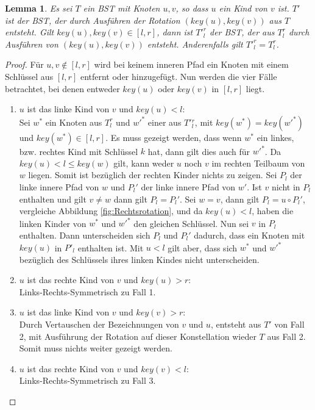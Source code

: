 \documentclass[a4paper,12pt]{article}
\newtheorem{Lemma}{Lemma}[section]
\begin{document}
\begin{Lemma}  \label{lemmaWilber1} Es sei $T$ ein BST mit Knoten $u, v$, so dass $u$ ein Kind von $v$ ist. $T'$ ist der BST, der durch Ausführen der Rotation $\left(\mathit{key}\left(u\right),\mathit{key}\left(v\right)\right)$ aus $T$ entsteht. Gilt $\mathit{key}\left(u\right),\mathit{key}\left(v\right) \in \left[l,r\right]$, dann ist ${T'}^r_l$ der BST, der aus $T^r_l$ durch Ausführen von  $\left(\mathit{key}\left(u\right),\mathit{key}\left(v\right)\right)$ entsteht. Anderenfalls gilt ${T'}^r_l = T^r_l$.
\end{Lemma}
\begin{proof}
	\noindent Für $u,v \notin \left[l,r\right]$ wird bei keinem inneren Pfad ein Knoten mit einem Schlüssel aus $\left[l,r\right]$ entfernt oder hinzugefügt.
	Nun werden die vier Fälle betrachtet, bei denen entweder $\mathit{key}\left(u\right)$ oder $\mathit{key}\left(v\right)$ in $\left[l,r\right]$ liegt.
	\begin{enumerate}
		\item $u$ ist das linke Kind von $v$ und $\mathit{key}\left(u\right) < l$:\\
		Sei $w^*$ ein Knoten aus $T^r_l$ und $w'^*$ einer aus $T'{^r_l}$, mit $\mathit{key}(w^*) = \mathit{key}(w'^*)$ und $\mathit{key}(w^*) \in \left[l,r\right]$. Es muss gezeigt werden, dass wenn $w^*$ ein linkes, bzw. rechtes Kind mit Schlüssel $k$ hat, dann gilt dies auch für $w'^*$. Da $\mathit{key}(u) < l \leq \mathit{key}(w) $ gilt, kann weder $u$ noch $v$ im rechten Teilbaum von $w$ liegen. Somit ist bezüglich der rechten Kinder nichts zu zeigen. 
		Sei $P_l$ der linke innere Pfad von $w$ und $ {P_l}'$ der linke innere Pfad von $w'$. Ist $v$ nicht in $P_l$ enthalten und gilt $v \neq w$ dann gilt $P_l = P{_l}'$. Sei $w = v$, dann gilt $P_l = u  \circ  {P_l}'$, vergleiche Abbildung \ref{fig:Rechtsrotation}, und da $\mathit{key}(u) < l$, haben die linken Kinder von $w^*$ und $w'^*$ den gleichen Schlüssel. Nun sei $v$ in $P_l$ enthalten. Dann unterscheiden sich  $P_l$ und  ${P_l}'$ dadurch, dass ein Knoten mit $\mathit{key}(u)$ in $P'_l$ enthalten ist. Mit $u < l$ gilt aber, dass sich $w^*$ und $w'^*$ bezüglich des Schlüssels ihres linken Kindes nicht unterscheiden.
	   	\item $u$ ist das rechte Kind von $v$ und $\mathit{key}\left(u\right) > r$:\\
	    Links-Rechts-Symmetrisch zu Fall 1. 	
		\item $u$ ist das linke Kind von $v$ und $\mathit{key}\left(v\right) > r$:\\
		Durch Vertauschen der Bezeichnungen von $v$ und $u$, entsteht aus $T'$ von Fall 2, mit Ausführung der Rotation auf dieser Konstellation wieder $T$ aus Fall 2. Somit muss nichts weiter gezeigt werden. 
		\item $u$ ist das rechte Kind von $v$ und $\mathit{key}\left(v\right) < l$:\\
		Links-Rechts-Symmetrisch zu Fall 3. \\
		

\end{enumerate}
\end{proof}
\end{document}

